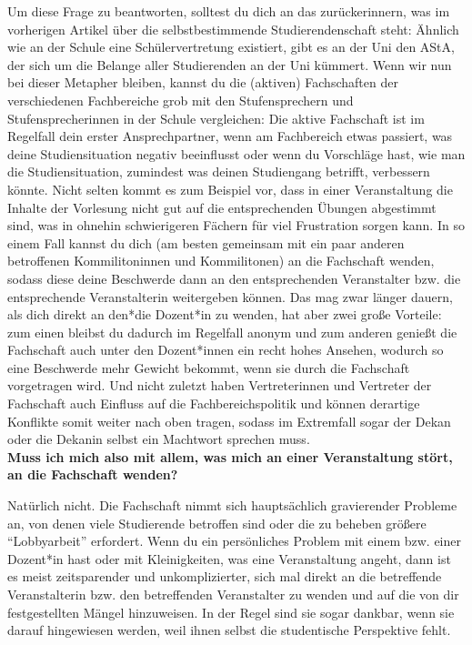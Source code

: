 {    Um diese Frage zu beantworten, solltest du dich an das zurückerinnern, was im vorherigen Artikel über die selbstbestimmende Studierendenschaft steht: Ähnlich wie an der Schule eine Schülervertretung existiert, gibt es an der Uni den AStA, der sich um die Belange aller Studierenden an der Uni kümmert. Wenn wir nun bei dieser Metapher bleiben, kannst du die (aktiven) Fachschaften der verschiedenen Fachbereiche grob mit den Stufensprechern und Stufensprecherinnen in der Schule vergleichen: Die aktive Fachschaft ist im Regelfall dein erster Ansprechpartner, wenn am Fachbereich etwas passiert, was deine Studiensituation negativ beeinflusst oder wenn du Vorschläge hast, wie man die Studiensituation, zumindest was deinen Studiengang betrifft, verbessern könnte. Nicht selten kommt es zum Beispiel vor, dass in einer Veranstaltung die Inhalte der Vorlesung nicht gut auf die entsprechenden Übungen abgestimmt sind, was in ohnehin schwierigeren Fächern für viel Frustration sorgen kann. In so einem Fall kannst du dich (am besten gemeinsam mit ein paar anderen betroffenen Kommilitoninnen und Kommilitonen) an die Fachschaft wenden, sodass diese deine Beschwerde dann an den entsprechenden Veranstalter bzw. die entsprechende Veranstalterin weitergeben können. Das mag zwar länger dauern, als dich direkt an den*die Dozent*in zu wenden, hat aber zwei große Vorteile: zum einen bleibst du dadurch im Regelfall anonym und zum anderen genießt die Fachschaft auch unter den Dozent*innen ein recht hohes Ansehen, wodurch so eine Beschwerde mehr Gewicht bekommt, wenn sie durch die Fachschaft vorgetragen wird. Und nicht zuletzt haben Vertreterinnen und Vertreter der Fachschaft auch Einfluss auf die Fachbereichspolitik und können derartige Konflikte somit weiter nach oben tragen, sodass im Extremfall sogar der Dekan oder die Dekanin selbst ein Machtwort sprechen muss.\\

    \textbf{Muss ich mich also mit allem, was mich an einer Veranstaltung stört, an die Fachschaft wenden?}

    Natürlich nicht. Die Fachschaft nimmt sich hauptsächlich gravierender Probleme an, von denen viele Studierende betroffen sind oder die zu beheben größere "`Lobbyarbeit"' erfordert. Wenn du ein persönliches Problem mit einem bzw. einer Dozent*in hast oder mit Kleinigkeiten, was eine Veranstaltung angeht, dann ist es meist zeitsparender und unkomplizierter, sich mal direkt an die betreffende Veranstalterin bzw. den betreffenden Veranstalter zu wenden und auf die von dir festgestellten Mängel hinzuweisen. In der Regel sind sie sogar dankbar, wenn sie darauf hingewiesen werden, weil ihnen selbst die studentische Perspektive fehlt.\\

}
